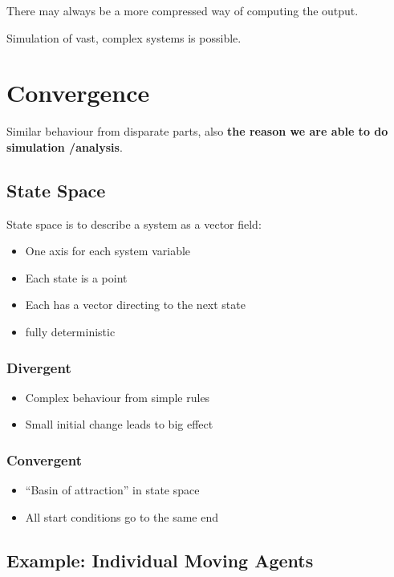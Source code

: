 \documentclass[a4paper, openany]{book}
\begin{document}
There may always be a more compressed way of computing
the output.

Simulation of vast, complex systems is possible.

\section{Convergence}

Similar behaviour from disparate parts, also \textbf{the reason we are able to do simulation \slash analysis}.

\subsection{State Space}

State space is to describe a system as a vector field:

\begin{itemize}
  \item One axis for each system variable
  \item Each state is a point
  \item Each has a vector directing to the next state
  \item fully deterministic
\end{itemize}

\subsubsection{Divergent}

\begin{itemize}
  \item Complex behaviour from simple rules
  \item Small initial change leads to big effect
\end{itemize}

\subsubsection{Convergent}

\begin{itemize}
  \item ``Basin of attraction'' in state space
  \item All start conditions go to the same end
\end{itemize}

\subsection{Example: Individual Moving Agents}
\end{document}
